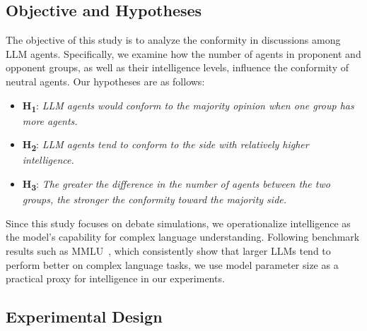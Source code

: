 \documentclass[11pt]{article}
\begin{document}
\subsection{Objective and Hypotheses}
The objective of this study is to analyze the conformity in discussions among LLM agents. Specifically, we examine how the number of agents in proponent and opponent groups, as well as their intelligence levels, influence the conformity of neutral agents. Our hypotheses are as follows:


\begin{itemize}
    \item \textbf{H\textsubscript{1}}: \textit{LLM agents would conform to the majority opinion when one group has more agents.}
    \item \textbf{H\textsubscript{2}}: \textit{LLM agents tend to conform to the side with relatively higher intelligence.}
    \item \textbf{H\textsubscript{3}}: \textit{The greater the difference in the number of agents between the two groups, the stronger the conformity toward the majority side.}
\end{itemize}

Since this study focuses on debate simulations, we operationalize intelligence as the model's capability for complex language understanding. Following benchmark results such as MMLU~\citep{hendrycks2020measuring}, which consistently show that larger LLMs tend to perform better on complex language tasks, we use model parameter size as a practical proxy for intelligence in our experiments.

\subsection{Experimental Design}
\end{document}
